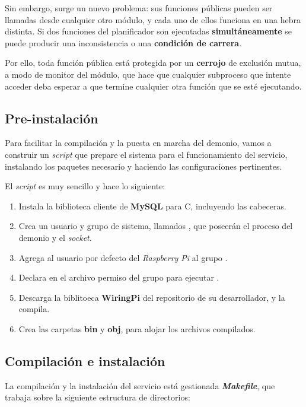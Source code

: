 Sin embargo, surge un nuevo problema: sus funciones públicas pueden ser llamadas desde cualquier otro módulo, y cada uno de ellos funciona en una hebra distinta. Si dos funciones del planificador son ejecutadas \textbf{simultáneamente} se puede producir una inconsistencia o una \textbf{condición de carrera}.

Por ello, toda función pública está protegida por un \textbf{cerrojo} de exclusión mutua, a modo de monitor del módulo, que hace que cualquier subproceso que intente acceder deba esperar a que termine cualquier otra función que se esté ejecutando.

\subsection{Pre-instalación}

Para facilitar la compilación y la puesta en marcha del demonio, vamos a construir un \textit{script} que prepare el sistema para el funcionamiento del servicio, instalando los paquetes necesario y haciendo las configuraciones pertinentes.

El \textit{script} es muy sencillo y hace lo siguiente:

\begin{enumerate}
	\item Instala la biblioteca cliente de \textbf{MySQL} para C, incluyendo las cabeceras.
	\item Crea un usuario y grupo de sistema, llamados , que poseerán el proceso del demonio y el \textit{socket}.
	\item Agrega al usuario por defecto del \textit{Raspberry Pi} al grupo .
	\item Declara en el archivo  permiso del grupo  para ejecutar .
	\item Descarga la biblitoeca \textbf{WiringPi} del repositorio de su desarrollador, y la compila.
	\item Crea las carpetas \textbf{bin} y \textbf{obj}, para alojar los archivos compilados.
\end{enumerate}

\subsection{Compilación e instalación}

La compilación y la instalación del servicio está gestionada \textbf{\textit{Makefile}}, que trabaja sobre la siguiente estructura de directorios:

